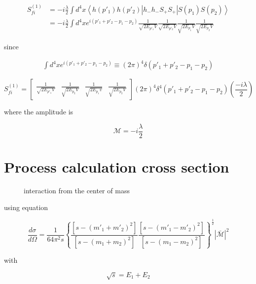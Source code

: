 \begin{equation}
  \begin{split}
    S_{fi}^{(1)} &= -i \frac{\lambda}{2} \int{ d^4x \left \langle h(p'_1) h(p'_2)| h_- h_- S_+ S_+ | S(p_1) S(p_2) \right \rangle }\\
    &=-i \frac{\lambda}{2} \int{ d^4x e^{i(p'_1+p'_2-p_1-p_2)} \frac{1}{\sqrt{2E_{p'_1}V}} \frac{1}{\sqrt{2E_{p'_2}V}} \frac{1}{\sqrt{2E_{p_1}V}} \frac{1}{\sqrt{2E_{p_2}V}} } 
  \end{split}
\end{equation}

since

\begin{align}
  \int{ d^4 x e^{i(p'_1+p'_2-p_1-p_2)} \equiv {(2 \pi)}^4 \delta (p'_1 + p'_2 - p_1 - p_2)}
\end{align}

\begin{equation}
  S_{fi}^{(1)} = \begin{bmatrix}\frac{1}{\sqrt{2E_{p'_1}V}} & \frac{1}{\sqrt{2E_{p_2}V}} & \frac{1}{\sqrt{2E_{p_1}v}} & \frac{1}{\sqrt{2E_{p_2}V}} \end{bmatrix} (2\pi)^4 \delta^4 (p'_1 + p'_2 - p_1 - p_2) \left( \frac{-i\lambda}{2} \right)
\end{equation}

where the amplitude is

\begin{equation}
  \mathcal{M} = -i \frac{\lambda}{2}
\end{equation}

\section{Process calculation cross section}

\begin{figure}
  \centering
  \caption{interaction from the center of mass}
\end{figure}

using equation

\begin{equation}
  \frac{d\sigma}{d\Omega} = \frac{1}{64 \pi^2 s} \left\{ \frac{ [s-(m'_1 +m'_2)^2]}{[s-(m_1 + m_2)^2]} \frac{[s-(m'_1 - m'_2)^2 ]}{[s-(m_1 -m_2)^2]} \right\}^{\frac{1}{2}} | \bar{\mathcal{M}} |^2  
\end{equation}

with

\begin{equation}
  \sqrt{s} = E_1 + E_2
\end{equation}

